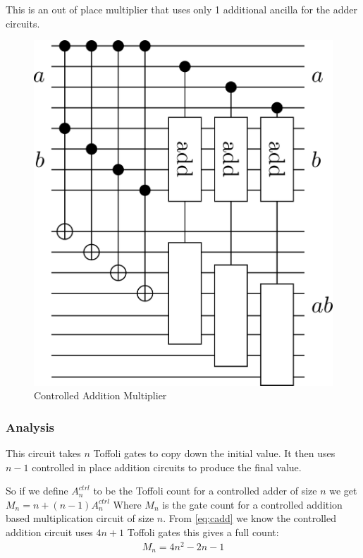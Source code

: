     This is an out of place multiplier that uses only 1 additional ancilla for the adder circuits.
    \begin{figure}[ht]
      \capstart
      \centering
      \includegraphics[scale=0.25]{images/multCtrlAdd}
      \caption{Controlled Addition Multiplier}
      \label{fig:multAdd}
    \end{figure}
    \subsubsection{Analysis}
      This circuit takes $n$ Toffoli gates to copy down the initial value.
      It then uses $n-1$ controlled in place addition circuits to produce the final value.

      So if we define $A^{ctrl}_n$ to be the Toffoli count for a controlled adder of size $n$ we get $M_n = n + (n-1)A^{ctrl}_n$
      Where $M_n$ is the gate count for a controlled addition based multiplication circuit of size $n$.
      From \eqref{eq:cadd} we know the controlled addition circuit uses $4n+1$ Toffoli gates this gives a full count:
      \begin{align} \label{eq:caddtoff}
        M_n = 4n^2 -2n -1
      \end{align}

